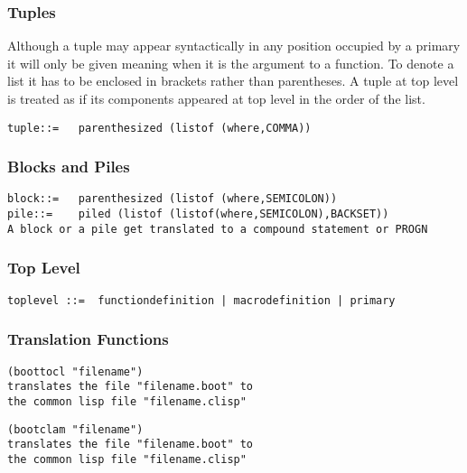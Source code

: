\documentclass{article}
\begin{document}
\subsubsection{Tuples}
\label{sec:boot:tuples}

Although a tuple may appear syntactically
in any position occupied by a primary
it will only be given meaning when it is the argument to a function.
To denote a list it has to be enclosed in brackets rather than
parentheses. A tuple at top level is treated as if its components
appeared at top level in the order of the list.
\begin{verbatim}  
tuple::=   parenthesized (listof (where,COMMA))
\end{verbatim} 

\subsubsection{Blocks and Piles}
\label{sec:boot:block}

\begin{verbatim}  
block::=   parenthesized (listof (where,SEMICOLON))
pile::=    piled (listof (listof(where,SEMICOLON),BACKSET))
A block or a pile get translated to a compound statement or PROGN
\end{verbatim} 

\subsubsection{Top Level}
\label{sec:boot:top-level}

\begin{verbatim}  
toplevel ::=  functiondefinition | macrodefinition | primary
\end{verbatim} 

\subsubsection{Translation Functions}
\label{sec:boot:translation}

\begin{verbatim}  
(boottocl "filename")
translates the file "filename.boot" to 
the common lisp file "filename.clisp"
\end{verbatim} 

\begin{verbatim} 
(bootclam "filename")
translates the file "filename.boot" to 
the common lisp file "filename.clisp" 
\end{verbatim} 
\end{document}
